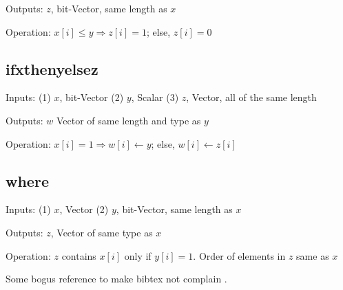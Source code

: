 \item Outputs: \(z\), bit-Vector, same length as \(x\)

\item Operation: \(x[i] \leq y \Rightarrow z[i] = 1\); else, \(z[i] = 0\)
\ei


\subsection{ifxthenyelsez}
\label{ifxthenyelsez}
\bi
\item Inputs: (1) \(x\), bit-Vector (2) \(y\), Scalar (3) \(z\), Vector, all of
the same length

\item Outputs: \(w\) Vector of same length and type as \(y\)

\item Operation: \(x[i] = 1 \Rightarrow w[i] \leftarrow y\); else, \(w[i]
\leftarrow z[i]\)

\ei


\subsection{where}
\label{where}
\bi
\item Inputs: (1) \(x\), Vector  (2) \(y\), bit-Vector, same length as \(x\)

\item Outputs: \(z\), Vector of same type as \(x\)

\item Operation: \(z\) contains \(x[i]\) only if
\(y[i] = 1\). Order of elements in  \(z\) same as \(x\)

\ei

\appendix
Some bogus reference to make bibtex not complain \cite{Hastie2009}.


